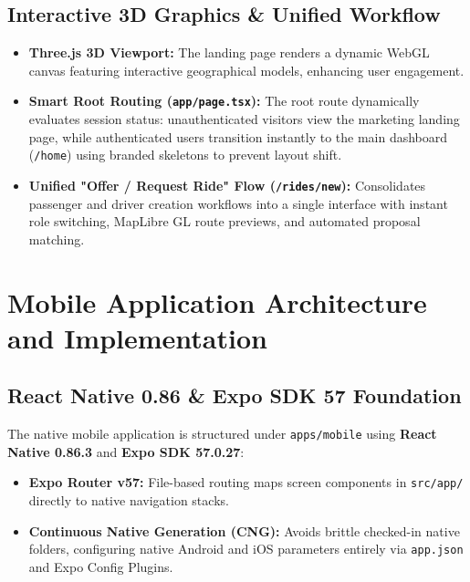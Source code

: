 \documentclass[conference,10pt,a4paper]{IEEEtran}
\begin{document}
\subsection{Interactive 3D Graphics \& Unified Workflow}
\begin{itemize}
    \item \textbf{Three.js 3D Viewport:} The landing page renders a dynamic WebGL canvas featuring interactive geographical models, enhancing user engagement.
    \item \textbf{Smart Root Routing (\texttt{app/page.tsx}):} The root route dynamically evaluates session status: unauthenticated visitors view the marketing landing page, while authenticated users transition instantly to the main dashboard (\texttt{/home}) using branded skeletons to prevent layout shift.
    \item \textbf{Unified "Offer / Request Ride" Flow (\texttt{/rides/new}):} Consolidates passenger and driver creation workflows into a single interface with instant role switching, MapLibre GL route previews, and automated proposal matching.
\end{itemize}

\section{Mobile Application Architecture and Implementation}

\subsection{React Native 0.86 \& Expo SDK 57 Foundation}
The native mobile application is structured under \texttt{apps/mobile} using \textbf{React Native 0.86.3} and \textbf{Expo SDK 57.0.27}:
\begin{itemize}
    \item \textbf{Expo Router v57:} File-based routing maps screen components in \texttt{src/app/} directly to native navigation stacks.
    \item \textbf{Continuous Native Generation (CNG):} Avoids brittle checked-in native folders, configuring native Android and iOS parameters entirely via \texttt{app.json} and Expo Config Plugins.
\end{itemize}
\end{document}
